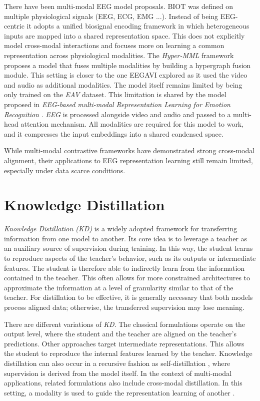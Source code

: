 There have been multi-modal EEG model proposals.
BIOT \cite{NEURIPS2023_f6b30f3e} was defined on multiple physiological signals (EEG, ECG, EMG ...).
Instead of being EEG-centric it adopts a unified biosignal encoding framework in which heterogeneous inputs are mapped into a shared representation space.
This does not explicitly model cross-modal interactions and focuses more on learning  a common representation across physiological modalities.
The \textit{Hyper-MML} \cite{kang2025hypergraphmultimodallearningeegbased} framework proposes a model that fuses multiple modalities by building a hypergraph fusion module.
This setting is closer to the one EEGAVI explored as it used the video and audio as additional modalities.
The model itself remains limited by being only trained on the \textit{EAV} dataset.
This limitation is shared by the model proposed in \textit{EEG-based multi-modal Representation Learning for Emotion Recognition} \cite{yin2024eegbasedmultimodalrepresentationlearning}.
\textit{EEG} is processed alongside video and audio and passed to a multi-head attention mechanism. All modalities are required for this model to work, and it compresses the input embeddings into a shared condensed space.

While multi-modal contrastive frameworks have demonstrated strong cross-modal alignment, their applications to EEG representation learning still remain limited, especially under data scarce conditions.


\section{Knowledge Distillation}
\textit{Knowledge Distillation (KD)}
\cite{hinton2015distillingknowledgeneuralnetwork, 10.1145/1150402.1150464} is a widely adopted framework for transferring information from one model to another.
Its core idea is to leverage a teacher as an auxiliary source of supervision during training.
In this way, the student learns to reproduce aspects of the teacher's behavior, such as its outputs or intermediate features.
The student is therefore able to indirectly learn from the information contained in the teacher.
This often allows for more constrained architectures to approximate the information at a level of granularity similar to that of the teacher.
For distillation to be effective, it is generally necessary that both models process aligned data; otherwise, the transferred supervision may lose meaning.

There are different variations of \textit{KD}.
The classical formulations operate on the output level, where the student and the teacher are aligned on the teacher's predictions.
Other approaches target intermediate representations.
This allows the student to reproduce the internal features learned by the teacher.
Knowledge distillation can also occur in a recursive fashion as self-distillation \cite{zhang2019teacherimproveperformanceconvolutional}, where supervision is derived from the model itself.
In the context of multi-modal applications, related formulations also include cross-modal distillation.
In this setting, a modality is used to guide the representation learning of another \cite{MOSLEMI2024100605}.

